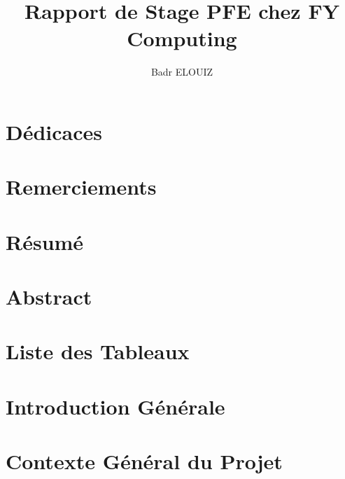 \documentclass[a4paper,11pt,oneside]{report}
\author{Badr ELOUIZ}
\title{Rapport de Stage PFE chez FY Computing}
\begin{document}
\sloppy

\makeatletter



\makeatother

\newpage

\newpage

\chapter*{Dédicaces}

\newpage

\chapter*{Remerciements}

\newpage

\chapter*{Résumé}

\newpage

\chapter*{Abstract}

\newpage

\tableofcontents

\newpage

\listoffigures

\newpage

\chapter*{Liste des Tableaux}

\newpage

\chapter*{Introduction Générale}



\newpage

\chapter{Contexte Général du Projet}

\newpage


\end{document}
